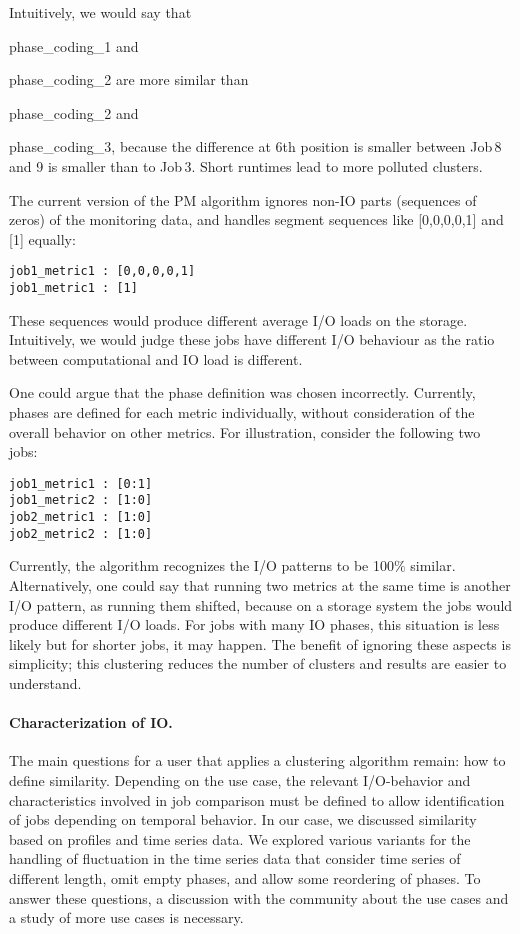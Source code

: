 \documentclass{jhps}
\begin{document}
Intuitively, we would say that {phase\_coding\_1 and{ phase\_coding\_2 are more similar than {phase\_coding\_2 and {phase\_coding\_3, because the difference at 6th position is smaller between Job\,8 and 9 is smaller than to Job\,3.
Short runtimes lead to more polluted clusters.

\medskip

The current version of the PM algorithm ignores non-IO parts (sequences of zeros) of the monitoring data, and  handles segment sequences like [0,0,0,0,1] and [1] equally:
\begin{lstlisting}
job1_metric1 : [0,0,0,0,1]
job1_metric1 : [1]
\end{lstlisting}

These sequences would produce different average I/O loads on the storage.
Intuitively, we would judge these jobs have different I/O behaviour as the ratio between computational and IO load is different.

One could argue that the phase definition was chosen incorrectly.
Currently, phases are defined for each metric individually, without consideration of the overall behavior on  other metrics.
For illustration, consider the following two jobs:
\begin{lstlisting}
job1_metric1 : [0:1]
job1_metric2 : [1:0]
job2_metric1 : [1:0]
job2_metric2 : [1:0]
\end{lstlisting}

Currently, the algorithm recognizes the I/O patterns to be 100$\%$ similar.
Alternatively, one could say that running two metrics at the same time is another I/O pattern, as running them shifted, because on a storage system the jobs would produce different I/O loads.
For jobs with many IO phases, this situation is less likely but for shorter jobs, it may happen.
The benefit of ignoring these aspects is simplicity; this clustering reduces the number of clusters and  results are easier to understand.

\medskip

\paragraph{Characterization of IO.}
The main questions for a user that applies a clustering algorithm remain: how to define similarity.
Depending on the use case, the relevant I/O-behavior and characteristics involved in job comparison must be defined to allow identification of jobs depending on temporal behavior.
In our case, we discussed similarity based on profiles and time series data.
We explored various variants for the handling of fluctuation in the time series data that consider time series of different length, omit empty phases, and allow some reordering of phases.
To answer these questions, a discussion with the community about the use cases and a study of more use cases is necessary.


}}}}
\end{document}
